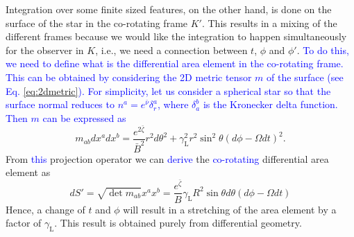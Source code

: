 \documentclass{aa}
\newcommand{\be}{\begin{equation}}
\newcommand{\ee}{\end{equation}}
\newcommand{\refe}[1]{\textcolor{blue}{{#1}}}
\newcommand{\Ob}{\ensuremath{\hat{\Omega}}}
\newcommand{\nub}{\ensuremath{\bar{\nu}}}
\newcommand{\zetab}{\ensuremath{\bar{\zeta}}}
\newcommand{\Bb}{\ensuremath{\bar{B}}}
\newcommand{\lgamma}{\gamma_{\text{L}}}
\begin{document}
Integration over some finite sized features, on the other hand, is done on the surface of the star in the co-rotating frame $K'$.
This results in a mixing of the different frames because we would like the integration to happen simultaneously for the observer in $K$, i.e., we need a connection between $t$, $\phi$ and $\phi'$.
\refe{To do this, we need to define what is the differential area element in the co-rotating frame.}
\refe{This can be obtained by considering the 2D metric tensor $m$ of the surface (see Eq. \eqref{eq:2dmetric}).}
\refe{For simplicity, let us consider a spherical star so that the surface normal reduces to $n^a = e^{\nub} \delta_r^a$, where $\delta_a^b$ is the Kronecker delta function.}
\refe{Then $m$ can be expressed as}
\be
m_{ab} dx^a dx^b = \frac{e^{2\zetab}}{\Bb^2} r^2 d\theta^2 + \lgamma^2 r^2 \sin^2\theta (d\phi - \Omega dt)^2.
\ee
From \refe{this} projection operator we can \refe{derive} the \refe{co-rotating} differential area element as
\be\label{eq:dSp}
dS' = \sqrt{\det m_{ab}} x^a x^b = \frac{e^{\zetab}}{B} \lgamma R^2 \sin\theta d\theta (d\phi - \Omega dt) 
\ee
Hence, a change of $t$ and $\phi$  will result in a stretching of the area element by a factor of $\lgamma$.
This result is obtained purely from differential geometry.
\end{document}
